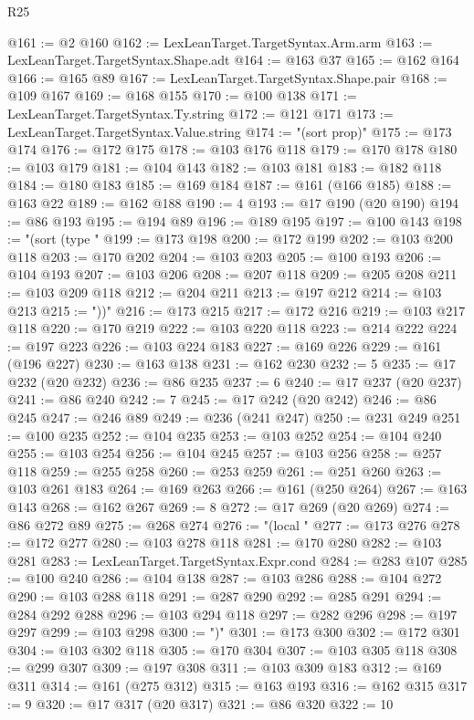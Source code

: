 \begin{lexlean}{R25}
\begin{coremodule}
@161 := @2 @160
@162 := LexLeanTarget.TargetSyntax.Arm.arm
@163 := LexLeanTarget.TargetSyntax.Shape.adt
@164 := @163 @37
@165 := @162 @164
@166 := @165 @89
@167 := LexLeanTarget.TargetSyntax.Shape.pair
@168 := @109 @167
@169 := @168 @155
@170 := @100 @138
@171 := LexLeanTarget.TargetSyntax.Ty.string
@172 := @121 @171
@173 := LexLeanTarget.TargetSyntax.Value.string
@174 := "(sort prop)"
@175 := @173 @174
@176 := @172 @175
@178 := @103 @176 @118
@179 := @170 @178
@180 := @103 @179
@181 := @104 @143
@182 := @103 @181
@183 := @182 @118
@184 := @180 @183
@185 := @169 @184
@187 := @161 (@166 @185)
@188 := @163 @22
@189 := @162 @188
@190 := 4
@193 := @17 @190 (@20 @190)
@194 := @86 @193
@195 := @194 @89
@196 := @189 @195
@197 := @100 @143
@198 := "(sort (type "
@199 := @173 @198
@200 := @172 @199
@202 := @103 @200 @118
@203 := @170 @202
@204 := @103 @203
@205 := @100 @193
@206 := @104 @193
@207 := @103 @206
@208 := @207 @118
@209 := @205 @208
@211 := @103 @209 @118
@212 := @204 @211
@213 := @197 @212
@214 := @103 @213
@215 := "))"
@216 := @173 @215
@217 := @172 @216
@219 := @103 @217 @118
@220 := @170 @219
@222 := @103 @220 @118
@223 := @214 @222
@224 := @197 @223
@226 := @103 @224 @183
@227 := @169 @226
@229 := @161 (@196 @227)
@230 := @163 @138
@231 := @162 @230
@232 := 5
@235 := @17 @232 (@20 @232)
@236 := @86 @235
@237 := 6
@240 := @17 @237 (@20 @237)
@241 := @86 @240
@242 := 7
@245 := @17 @242 (@20 @242)
@246 := @86 @245
@247 := @246 @89
@249 := @236 (@241 @247)
@250 := @231 @249
@251 := @100 @235
@252 := @104 @235
@253 := @103 @252
@254 := @104 @240
@255 := @103 @254
@256 := @104 @245
@257 := @103 @256
@258 := @257 @118
@259 := @255 @258
@260 := @253 @259
@261 := @251 @260
@263 := @103 @261 @183
@264 := @169 @263
@266 := @161 (@250 @264)
@267 := @163 @143
@268 := @162 @267
@269 := 8
@272 := @17 @269 (@20 @269)
@274 := @86 @272 @89
@275 := @268 @274
@276 := "(local "
@277 := @173 @276
@278 := @172 @277
@280 := @103 @278 @118
@281 := @170 @280
@282 := @103 @281
@283 := LexLeanTarget.TargetSyntax.Expr.cond
@284 := @283 @107
@285 := @100 @240
@286 := @104 @138
@287 := @103 @286
@288 := @104 @272
@290 := @103 @288 @118
@291 := @287 @290
@292 := @285 @291
@294 := @284 @292 @288
@296 := @103 @294 @118
@297 := @282 @296
@298 := @197 @297
@299 := @103 @298
@300 := ")"
@301 := @173 @300
@302 := @172 @301
@304 := @103 @302 @118
@305 := @170 @304
@307 := @103 @305 @118
@308 := @299 @307
@309 := @197 @308
@311 := @103 @309 @183
@312 := @169 @311
@314 := @161 (@275 @312)
@315 := @163 @193
@316 := @162 @315
@317 := 9
@320 := @17 @317 (@20 @317)
@321 := @86 @320
@322 := 10

\end{coremodule}
\end{lexlean}

